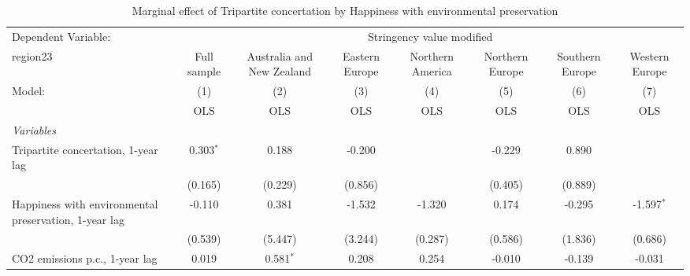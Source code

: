
\begin{table}[htbp]
   \caption{Marginal effect of Tripartite concertation by Happiness with environmental preservation}
   \centering
   \begin{tabular}{lccccccc}
      \toprule
      Dependent Variable: & \multicolumn{7}{c}{Stringency value modified}\\
      region23                                                                                    & Full sample   & Australia and New Zealand & Eastern Europe & Northern America & Northern Europe & Southern Europe & Western Europe \\   
      Model:                                                                                      & (1)           & (2)                       & (3)            & (4)              & (5)             & (6)             & (7)\\  
                                                                                                  &  OLS          & OLS                       & OLS            & OLS              & OLS             & OLS             & OLS\\  
      \midrule
      \emph{Variables}\\
      Tripartite concertation, 1-year lag                                                         & 0.303$^{*}$   & 0.188                     & -0.200         &                  & -0.229          & 0.890           &   \\   
                                                                                                  & (0.165)       & (0.229)                   & (0.856)        &                  & (0.405)         & (0.889)         &   \\   
      Happiness with environmental preservation, 1-year lag                                       & -0.110        & 0.381                     & -1.532         & -1.320           & 0.174           & -0.295          & -1.597$^{*}$\\   
                                                                                                  & (0.539)       & (5.447)                   & (3.244)        & (0.287)          & (0.586)         & (1.836)         & (0.686)\\   
      CO2 emissions p.c., 1-year lag                                                              & 0.019         & 0.581$^{*}$               & 0.208          & 0.254            & -0.010          & -0.139          & -0.031\\   

\end{tabular}
\end{table}
